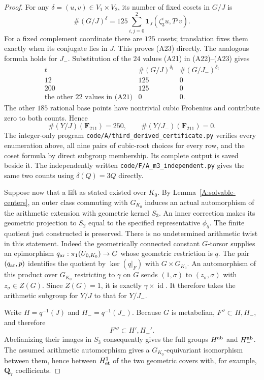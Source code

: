 \begin{proof}
For any $\delta=(u,v)\in V_1\times V_2$, its number of
fixed cosets in $G/J$ is
\[
 \#(G/J)^\delta
   =125\sum_{i,j=0}^2
       \mathbf1_J(\zeta_3^iu,T^jv).                            \tag{A23}
\]
For a fixed complement coordinate there are $125$ cosets;
translation fixes them exactly when its conjugate lies
in $J$. This proves (A23) directly. The analogous formula
holds for $J_-$. Substitution of the $24$ values (A21)
in (A22)--(A23) gives
\[
\begin{array}{c|rr}
 t&\#(G/J)^{\delta_t}&\#(G/J_-)^{\delta_t}\\ \hline
 12&125&0\\
 200&125&0\\
 \text{the other 22 values in (A21)}&0&0.
\end{array}
\]
The other $185$ rational base points have nontrivial cubic
Frobenius and contribute zero to both counts. Hence
\[
       \#(Y/J)(\mathbf F_{211})=250,
       \qquad \#(Y/J_-)(\mathbf F_{211})=0.                     \tag{A24}
\]
The integer-only program
\texttt{code/A/third\_derived\_certificate.py} verifies
every enumeration above, all nine pairs of cubic-root
choices for every row, and the coset formula by direct
subgroup membership. Its complete output is saved beside
it. The independently written
\texttt{code/F/A\_m3\_independent.py} gives the same two
counts using $\delta(Q)=3Q$ directly.

Suppose now that a lift as stated existed over $K_0$.
By Lemma~\ref{A:solvable-centers}, an outer class commuting
with $G_{K_0}$ induces an actual automorphism of the
arithmetic extension with geometric kernel $S_3$.
An inner correction makes its geometric projection to
$S_2$ equal to the specified representative $\phi_5$.
The finite quotient just constructed is preserved.
There is no undetermined arithmetic twist in this
statement. Indeed the geometrically connected constant
$G$-torsor supplies an epimorphism
$q_{\rm ar}:\pi_1(U_{0,K_0})\to G$ whose geometric
restriction is $q$. The pair $(q_{\rm ar},p)$ identifies
the quotient by $\ker(q|_F)$ with $G\times G_{K_0}$.
An automorphism of this product over $G_{K_0}$ restricting
to $\gamma$ on $G$ sends $(1,\sigma)$ to
$(z_\sigma,\sigma)$ with $z_\sigma\in Z(G)$. Since
$Z(G)=1$, it is exactly $\gamma\times\operatorname{id}$.
It therefore takes the arithmetic subgroup for $Y/J$
to that for $Y/J_-$.

Write $H=q^{-1}(J)$ and $H_-=q^{-1}(J_-)$. Because $G$
is metabelian, $F''\subset H,H_-$, and therefore
\[
                       F'''\subset H',H_-'.
\]
Abelianizing their images in $S_3$ consequently gives
the full groups $H^{\rm ab}$ and $H_-^{\rm ab}$.
The assumed arithmetic automorphism gives a
$G_{K_0}$-equivariant isomorphism between them, hence
between $H^1_{\rm et}$ of the two geometric covers with,
for example, $\mathbf Q_7$ coefficients.


\end{proof}
